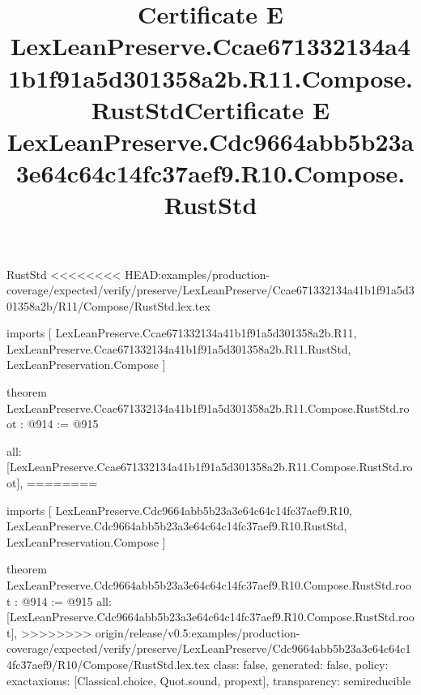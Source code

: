 \begin{lexlean}{RustStd}
<<<<<<<< HEAD:examples/production-coverage/expected/verify/preserve/LexLeanPreserve/Ccae671332134a41b1f91a5d301358a2b/R11/Compose/RustStd.lex.tex
\title{Certificate E LexLeanPreserve.Ccae671332134a41b1f91a5d301358a2b.R11.Compose.RustStd}
\begin{coremodule}
imports [
  LexLeanPreserve.Ccae671332134a41b1f91a5d301358a2b.R11,
  LexLeanPreserve.Ccae671332134a41b1f91a5d301358a2b.R11.RustStd,
  LexLeanPreservation.Compose
]

theorem LexLeanPreserve.Ccae671332134a41b1f91a5d301358a2b.R11.Compose.RustStd.root : @914 := @915 {
  all: [LexLeanPreserve.Ccae671332134a41b1f91a5d301358a2b.R11.Compose.RustStd.root],
========
\title{Certificate E LexLeanPreserve.Cdc9664abb5b23a3e64c64c14fc37aef9.R10.Compose.RustStd}
\begin{coremodule}
imports [
  LexLeanPreserve.Cdc9664abb5b23a3e64c64c14fc37aef9.R10,
  LexLeanPreserve.Cdc9664abb5b23a3e64c64c14fc37aef9.R10.RustStd,
  LexLeanPreservation.Compose
]

theorem LexLeanPreserve.Cdc9664abb5b23a3e64c64c14fc37aef9.R10.Compose.RustStd.root : @914 := @915 {
  all: [LexLeanPreserve.Cdc9664abb5b23a3e64c64c14fc37aef9.R10.Compose.RustStd.root],
>>>>>>>> origin/release/v0.5:examples/production-coverage/expected/verify/preserve/LexLeanPreserve/Cdc9664abb5b23a3e64c64c14fc37aef9/R10/Compose/RustStd.lex.tex
  class: false,
  generated: false,
  policy: exact{axioms: [Classical.choice, Quot.sound, propext]},
  transparency: semireducible
}


\end{coremodule}}
\end{coremodule}
\end{lexlean}
